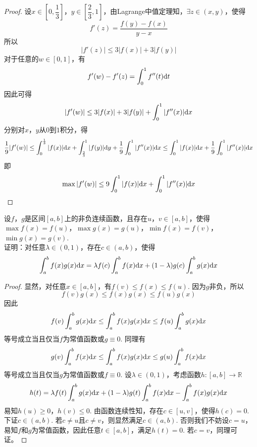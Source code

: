 \begin{proof}

    设$x \in \left[0, \dfrac{1}{3}\right]$，$y \in \left[\dfrac{2}{3}, 1\right]$，由\textup{Lagrange}中值定理知，$\exists z \in (x,y)$，使得
    $$f'(z) = \dfrac{f(y) - f(x)}{y - x}$$
    所以
    $$|f'(z)| \leq 3|f(x)| + 3|f(y)|$$
    对于任意的$w \in [0,1]$，有
    $$f'(w) - f'(z) = \int_{0}^{1}{f''(t)}\mathrm{d} t$$
    因此可得
    $$|f'(w)| \leq 3|f(x)| + 3|f(y)| + \int_{0}^{1}{|f''(x)|}\mathrm{d} x$$
    分别对$x$，$y$从$0$到$1$积分，得
    $$\dfrac{1}{9} |f'(w)| \leq \int_{0}^{\frac{1}{3}}{|f(x)|}\mathrm{d} x + \int_{\frac{2}{3}}^{1}{|f(y)|}\mathrm{d} y + \dfrac{1}{9} \int_{0}^{1}{|f''(x)|}\mathrm{d} x \leq \int_{0}^{1}{|f(x)|}\mathrm{d} x + \dfrac{1}{9}\int_{0}^{1}{|f''(x)|}\mathrm{d} x$$
    即
    $$\max{|f'(w)|} \leq 9\int_{0}^{1}{|f(x)|}\mathrm{d} x + \int_{0}^{1}{|f''(x)|}\mathrm{d} x$$
    
\end{proof}

\begin{theorem}
    
    设$f$，$g$是区间$[a,b]$上的非负连续函数，且存在$u$，$v \in [a,b]$，使得$\max{f(x)} = f(u)$，$\max{g(x)} = g(u)$，$\min{f(x)} = f(v)$，$\min{g(x)} = g(v)$. \\
    证明：对任意$\lambda \in (0,1)$，存在$c \in (a,b)$，使得
    $$\int_{a}^{b}{f(x)g(x)}\mathrm{d} x = \lambda f(c) \int_{a}^{b}{f(x)}\mathrm{d} x + (1 - \lambda)g(c)\int_{a}^{b}{g(x)}\mathrm{d} x$$

\end{theorem}

\begin{proof}

    显然，对任意$x \in [a,b]$，有$f(v) \leq f(x) \leq f(u)$. 因为$g$非负，所以
    $$f(v)g(x) \leq f(x)g(x) \leq f(u)g(x)$$
    因此
    $$f(v) \int_{a}^{b}{g(x)}\mathrm{d} x \leq \int_{a}^{b}{f(x)g(x)}\mathrm{d} x \leq f(u) \int_{a}^{b}{g(x)}\mathrm{d} x$$
    等号成立当且仅当$f$为常值函数或$g \equiv 0$. 同理有
    $$g(v) \int_{a}^{b}{f(x)}\mathrm{d} x \leq \int_{a}^{b}{f(x)g(x)}\mathrm{d} x \leq g(u) \int_{a}^{b}{f(x)}\mathrm{d} x$$
    等号成立当且仅当$g$为常值函数或$f \equiv 0$. 设$\lambda \in (0,1)$，考虑函数$h : [a,b] \to \mathbb{R}$
    $$h(t) = \lambda f(t) \int_{a}^{b}{g(x)}\mathrm{d} x + (1 - \lambda)g(t)\int_{a}^{b}{f(x)}\mathrm{d} x - \int_{a}^{b}{f(x)g(x)}\mathrm{d} x$$
    易知$h(u) \geq 0$，$h(v) \leq 0$. 由函数连续性知，存在$c \in [u,v]$，使得$h(c) = 0$. \\
    下证$c \in (a,b)$. 若$c \neq u$且$c \neq v$，则显然满足$c \in (a,b)$. 
    否则我们不妨设$c = u$，易知$f$和$g$为常值函数，因此任意$t \in [a,b]$，满足$h(t) = 0$. 若$c = v$，同理可证。

\end{proof} 
